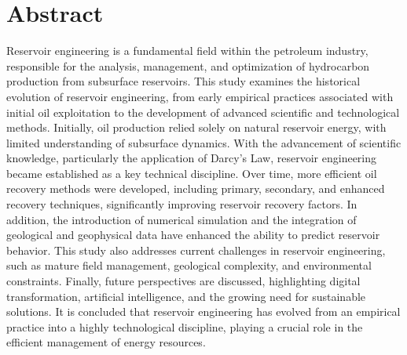 \documentclass[12pt,a4paper]{report}
\begin{document}
\chapter*{Abstract}
Reservoir engineering is a fundamental field within the petroleum industry, responsible for the analysis, management, and optimization of hydrocarbon production from subsurface reservoirs. This study examines the historical evolution of reservoir engineering, from early empirical practices associated with initial oil exploitation to the development of advanced scientific and technological methods. Initially, oil production relied solely on natural reservoir energy, with limited understanding of subsurface dynamics. With the advancement of scientific knowledge, particularly the application of Darcy’s Law, reservoir engineering became established as a key technical discipline.
Over time, more efficient oil recovery methods were developed, including primary, secondary, and enhanced recovery techniques, significantly improving reservoir recovery factors. In addition, the introduction of numerical simulation and the integration of geological and geophysical data have enhanced the ability to predict reservoir behavior.
This study also addresses current challenges in reservoir engineering, such as mature field management, geological complexity, and environmental constraints. Finally, future perspectives are discussed, highlighting digital transformation, artificial intelligence, and the growing need for sustainable solutions. It is concluded that reservoir engineering has evolved from an empirical practice into a highly technological discipline, playing a crucial role in the efficient management of energy resources.



\tableofcontents
\newpage


\end{document}
